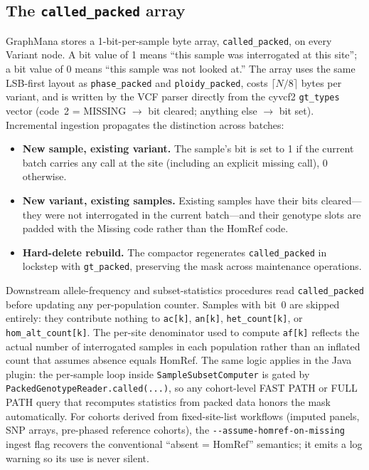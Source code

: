 \documentclass[11pt,a4paper]{article}
\begin{document}
\subsection*{The \texttt{called\_packed} array}

GraphMana stores a 1-bit-per-sample byte array, \texttt{called\_packed}, on every Variant node. A bit value of 1 means ``this sample was interrogated at this site''; a bit value of 0 means ``this sample was not looked at.'' The array uses the same LSB-first layout as \texttt{phase\_packed} and \texttt{ploidy\_packed}, costs $\lceil N/8 \rceil$ bytes per variant, and is written by the VCF parser directly from the cyvcf2 \texttt{gt\_types} vector (code~2 = MISSING $\rightarrow$ bit cleared; anything else $\rightarrow$ bit set). Incremental ingestion propagates the distinction across batches:

\begin{itemize}
  \item \textbf{New sample, existing variant.} The sample's bit is set to 1 if the current batch carries any call at the site (including an explicit missing call), 0 otherwise.
  \item \textbf{New variant, existing samples.} Existing samples have their bits cleared---they were not interrogated in the current batch---and their genotype slots are padded with the Missing code rather than the HomRef code.
  \item \textbf{Hard-delete rebuild.} The compactor regenerates \texttt{called\_packed} in lockstep with \texttt{gt\_packed}, preserving the mask across maintenance operations.
\end{itemize}

Downstream allele-frequency and subset-statistics procedures read \texttt{called\_packed} before updating any per-population counter. Samples with bit~0 are skipped entirely: they contribute nothing to \texttt{ac[k]}, \texttt{an[k]}, \texttt{het\_count[k]}, or \texttt{hom\_alt\_count[k]}. The per-site denominator used to compute \texttt{af[k]} reflects the actual number of interrogated samples in each population rather than an inflated count that assumes absence equals HomRef. The same logic applies in the Java plugin: the per-sample loop inside \texttt{SampleSubsetComputer} is gated by \texttt{PackedGenotypeReader.called(...)}, so any cohort-level FAST PATH or FULL PATH query that recomputes statistics from packed data honors the mask automatically. For cohorts derived from fixed-site-list workflows (imputed panels, SNP arrays, pre-phased reference cohorts), the \texttt{-{}-assume-homref-on-missing} ingest flag recovers the conventional ``absent = HomRef'' semantics; it emits a log warning so its use is never silent.
\end{document}
